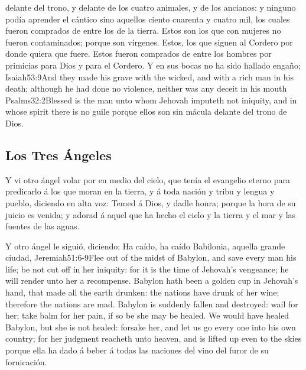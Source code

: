  delante del trono, y delante de los cuatro animales, y de los ancianos: y ninguno podía aprender el cántico sino aquellos ciento cuarenta y cuatro mil, los cuales fueron comprados de entre los de la tierra. 
Estos son los que con mujeres no fueron contaminados; porque son vírgenes. Estos, los que siguen al Cordero por donde quiera que fuere. Estos fueron comprados de entre los hombres por primicias para Dios y para el Cordero. 
Y en sus bocas no ha sido hallado engaño;%
				   {Isaiah}{53:9}{And they made his grave with the wicked, and with a rich man in his death; although he had done no violence, neither was any deceit in his mouth}%
				   {Psalms}{32:2}{Blessed is the man unto whom Jehovah imputeth not iniquity, and in whose spirit there is no guile}
 porque ellos son sin mácula delante del trono de Dios.
\subsection*{Los Tres Ángeles}
Y vi otro ángel volar por en medio del cielo, que tenía el evangelio eterno para predicarlo á los que moran en la tierra, y á toda nación y tribu y lengua y pueblo, 
diciendo en alta voz: Temed á Dios, y dadle honra; porque la hora de su juicio es venida; y adorad á aquel que ha hecho el cielo y la tierra y el mar y las fuentes de las aguas.

Y otro ángel le siguió, diciendo: Ha caído, ha caído Babilonia, aquella grande ciudad,%
				  {Jeremiah}{51:6-9}{Flee out of the midst of Babylon, and save every man his life; be not cut off in her iniquity: for it is the time of Jehovah’s vengeance; he will render unto her a recompense. Babylon hath been a golden cup in Jehovah’s hand, that made all the earth drunken: the nations have drunk of her wine; therefore the nations are mad. Babylon is suddenly fallen and destroyed: wail for her; take balm for her pain, if so be she may be healed. We would have healed Babylon, but she is not healed: forsake her, and let us go every one into his own country; for her judgment reacheth unto heaven, and is lifted up even to the skies}
 porque ella ha dado á beber á todas las naciones del vino del furor de su fornicación.

